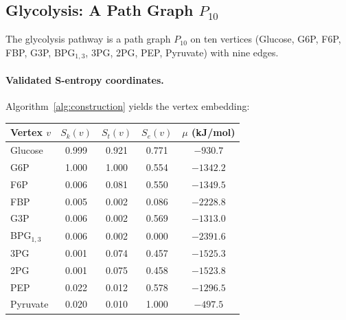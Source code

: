 \documentclass[11pt,twocolumn]{article}
\theoremstyle{plain}
\theoremstyle{definition}
\newcommand{\Sk}{S_k}
\newcommand{\St}{S_t}
\newcommand{\Se}{S_e}
\begin{document}
\subsection{Glycolysis: A Path Graph $P_{10}$}
\label{sec:glycolysis}

The glycolysis pathway is a path graph $P_{10}$ on ten vertices (Glucose,
G6P, F6P, FBP, G3P, BPG$_{1,3}$, 3PG, 2PG, PEP, Pyruvate) with nine edges.

\paragraph{Validated S-entropy coordinates.}
Algorithm~\ref{alg:construction} yields the vertex embedding:
\begin{center}
\begin{tabular}{lcccc}
\toprule
Vertex $v$ & $\Sk(v)$ & $\St(v)$ & $\Se(v)$ & $\mu$ (kJ/mol) \\
\midrule
Glucose    & 0.999 & 0.921 & 0.771 & $-930.7$ \\
G6P        & 1.000 & 1.000 & 0.554 & $-1342.2$ \\
F6P        & 0.006 & 0.081 & 0.550 & $-1349.5$ \\
FBP        & 0.005 & 0.002 & 0.086 & $-2228.8$ \\
G3P        & 0.006 & 0.002 & 0.569 & $-1313.0$ \\
BPG$_{1,3}$ & 0.006 & 0.002 & 0.000 & $-2391.6$ \\
3PG        & 0.001 & 0.074 & 0.457 & $-1525.3$ \\
2PG        & 0.001 & 0.075 & 0.458 & $-1523.8$ \\
PEP        & 0.022 & 0.012 & 0.578 & $-1296.5$ \\
Pyruvate   & 0.020 & 0.010 & 1.000 & $-497.5$ \\
\bottomrule
\end{tabular}
\end{center}
\end{document}
